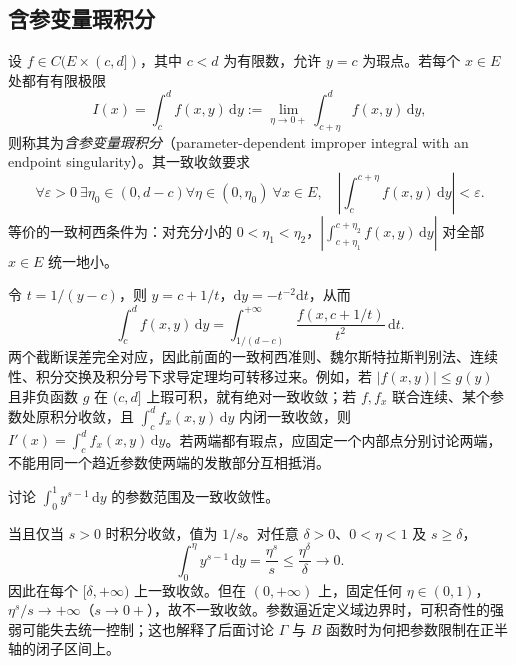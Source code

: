 \documentclass[UTF8,12pt,a4paper,fontset=fandol]{ctexbook}
\begin{document}
\subsection{含参变量瑕积分}
\label{subsec:parameter-dependent-singular-integrals}

设 $f\in C(E\times(c,d])$，其中 $c<d$ 为有限数，允许 $y=c$ 为瑕点。若每个 $x\in E$ 处都有有限极限
\[
    I(x)=\int_c^d f(x,y)\,\mathrm{d}y
    :=\lim_{\eta\to0+}\int_{c+\eta}^d f(x,y)\,\mathrm{d}y,
\]
则称其为\emph{含参变量瑕积分}（parameter-dependent improper integral with an endpoint singularity）。其一致收敛要求
\begin{equation}
    \forall\varepsilon>0\ \exists\eta_0\in(0,d-c)
    \forall\eta\in(0,\eta_0)\ \forall x\in E,
    \quad\left|\int_c^{c+\eta}f(x,y)\,\mathrm{d}y\right|<\varepsilon.
    \label{eq:parameter-singular-uniform-tail}
\end{equation}
等价的一致柯西条件为：对充分小的 $0<\eta_1<\eta_2$，$|\int_{c+\eta_1}^{c+\eta_2}f(x,y)\,\mathrm{d}y|$ 对全部 $x\in E$ 统一地小。

令 $t=1/(y-c)$，则 $y=c+1/t$，$\mathrm{d}y=-t^{-2}\mathrm{d}t$，从而
\begin{equation}
    \int_c^d f(x,y)\,\mathrm{d}y
    =\int_{1/(d-c)}^{+\infty}
        \frac{f(x,c+1/t)}{t^2}\,\mathrm{d}t.
    \label{eq:parameter-singular-to-infinite}
\end{equation}
两个截断误差完全对应，因此前面的一致柯西准则、魏尔斯特拉斯判别法、连续性、积分交换及积分号下求导定理均可转移过来。例如，若 $|f(x,y)|\leq g(y)$ 且非负函数 $g$ 在 $(c,d]$ 上瑕可积，就有绝对一致收敛；若 $f,f_x$ 联合连续、某个参数处原积分收敛，且 $\int_c^d f_x(x,y)\,\mathrm{d}y$ 内闭一致收敛，则 $I'(x)=\int_c^d f_x(x,y)\,\mathrm{d}y$。若两端都有瑕点，应固定一个内部点分别讨论两端，不能用同一个趋近参数使两端的发散部分互相抵消。

\begin{example}
\label{ex:parameter-power-singularity-uniformity}
讨论 $\displaystyle\int_0^1y^{s-1}\,\mathrm{d}y$ 的参数范围及一致收敛性。
\end{example}

\begin{solve}
当且仅当 $s>0$ 时积分收敛，值为 $1/s$。对任意 $\delta>0$、$0<\eta<1$ 及 $s\geq\delta$，
\[
    \int_0^\eta y^{s-1}\,\mathrm{d}y
    =\frac{\eta^s}{s}\leq\frac{\eta^\delta}{\delta}\longrightarrow0.
\]
因此在每个 $[\delta,+\infty)$ 上一致收敛。但在 $(0,+\infty)$ 上，固定任何 $\eta\in(0,1)$，$\eta^s/s\to+\infty$（$s\to0+$），故不一致收敛。参数逼近定义域边界时，可积奇性的强弱可能失去统一控制；这也解释了后面讨论 $\Gamma$ 与 $B$ 函数时为何把参数限制在正半轴的闭子区间上。
\end{solve}
\end{document}
